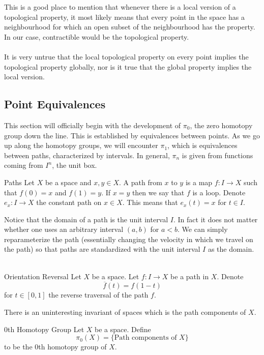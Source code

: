 \documentclass[a4paper]{article}
\begin{document}
This is a good place to mention that whenever there is a local version of a topological property, it most likely means that every point in the space has a neighbourhood for which an open subset of the neighbourhood has the property. In our case, contractible would be the topological property. \\~\\

It is very untrue that the local topological property on every point implies the topological property globally, nor is it true that the global property implies the local version. 

\subsection{Point Equivalences}
This section will officially begin with the development of $\pi_0$, the zero homotopy group down the line. This is established by equivalences between points. As we go up along the homotopy groups, we will encounter $\pi_1$, which is equivalences between paths, characterized by intervals. In general, $\pi_n$ is given from functions coming from $I^n$, the unit box. 

\begin{defn}{Paths}{} Let $X$ be a space and $x,y\in X$. A path from $x$ to $y$ is a map $f:I\to X$ such that $f(0)=x$ and $f(1)=y$. If $x=y$ then we say that $f$ is a loop. Denote $e_x:I\to X$ the constant path on $x\in X$. This means that $e_x(t)=x$ for $t\in I$. 
\end{defn}

Notice that the domain of a path is the unit interval $I$. In fact it does not matter whether one uses an arbitrary interval $(a,b)$ for $a<b$. We can simply reparameterize the path (essentially changing the velocity in which we travel on the path) so that paths are standardized with the unit interval $I$ as the domain. \\~\\

\begin{defn}{Orientation Reversal}{} Let $X$ be a space. Let $f:I\to X$ be a path in $X$. Denote $$\overline{f}(t)=f(1-t)$$ for $t\in[0,1]$ the reverse traversal of the path $f$. 
\end{defn}

There is an uninteresting invariant of spaces which is the path components of $X$. 

\begin{defn}{0th Homotopy Group}{} Let $X$ be a space. Define $$\pi_0(X)=\{\text{Path components of }X\}$$ to be the $0$th homotopy group of $X$. 
\end{defn}
\end{document}

